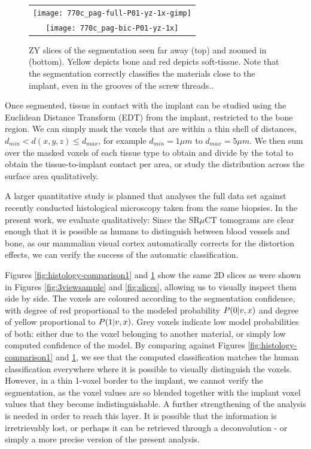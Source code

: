 \begin{figure}
  \centering
  \begin{tabular}{c}
    \texttt{[image: 770c\_pag-full-P01-yz-1x-gimp]} \\
    \texttt{[image: 770c\_pag-bic-P01-yz-1x]}
  \end{tabular}
  \caption{ZY slices of the segmentation seen far away (top) and zoomed in (bottom). Yellow depicts bone and red depicts soft-tissue. Note that the segmentation correctly classifies the materials close to the implant, even in the grooves of the screw threads..}
  \label{fig:histology-comparison2}
\end{figure}


Once segmented, tissue in contact with the implant can be studied using the
Euclidean Distance Transform (EDT) from the implant, restricted to the bone region. We can
simply mask the voxels that are within a thin shell of distances, $d_{min} < d(x,y,z) \le d_{max}$,
for example $d_{min} = 1\mu m$ to $d_{max} = 5\mu m$. We then sum over the masked voxels of each
tissue type to obtain and divide by the total to obtain the tissue-to-implant contact per area,
or study the distribution across the surface area qualitatively.

A larger quantitative study is planned that analyses the full data set against recently conducted 
histological microscopy taken from the same biopsies. In the present work, we evaluate qualitatively:
Since the SR$\mu$CT tomograms are
clear enough that it is possible as humans to distinguish between blood vessels and bone,
as our mammalian visual cortex automatically corrects for the distortion effects, we can verify
the success of the automatic classification.

Figures \ref{fig:histology-comparison1} and \ref{fig:histology-comparison2} show the same 2D slices
as were shown in Figures \ref{fig:3viewsample} and \ref{fig:slices}, allowing us to visually inspect
them side by side. The voxels are coloured according to the segmentation confidence, with
degree of red proportional to the modeled probability $P(0|v,x)$ and degree of yellow proportional
to $P(1|v,x)$. Grey voxels indicate low model probabilities of both: either due to the voxel belonging
to another material, or simply low computed confidence of the model.
By comparing against Figures \ref{fig:histology-comparison1} and \ref{fig:histology-comparison2},
we see that the computed classification matches the human classification everywhere where it
is possible to visually distinguish the voxels. However, in a thin 1-voxel border
to the implant, we cannot verify the segmentation, as the voxel values are so blended together
with the implant voxel values that they become indistinguishable. A further strengthening of the analysis
is needed in order to reach this layer. It is possible that the information is irretrievably lost, or perhaps it
can be retrieved through a deconvolution - or simply a more precise version of the present analysis.


